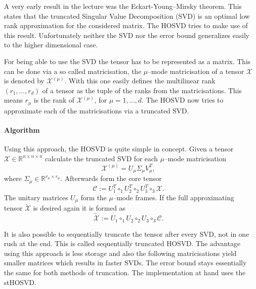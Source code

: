\documentclass[%
a4paper,
parskip=half,
DIV=calc,
]
{scrartcl}
\begin{document}
A very early result in the lecture was the Eckart-Young--Mirsky
theorem. This states that the truncated Singular Value Decomposition
(SVD) is an optimal low rank approximation for the considered matrix.
The HOSVD tries to make use of this result. Unfortunately neither the
SVD nor the error bound generalizes easily to the higher dimensional
case.

For being able to use the SVD the tensor has to be represented as a
matrix.  This can be done via a so called matricisation, the
$\mu$--mode matricisation of a tensor $\mathcal{X}$ is denoted by
$\mathcal{X}^{(\mu)}$.  With this one easily defines the multilinear
rank $(r_1, \ldots, r_d)$ of a tensor as the tuple of the ranks from
the matricisations.  This means $r_{\mu}$ is the rank of
$\mathcal{X}^{(\mu)}$, for $\mu = 1, \ldots, d$. The HOSVD now tries
to approximate each of the matricisations via a truncated
SVD.

\paragraph{Algorithm}

Using this approach, the HOSVD is quite simple in concept. Given a
tensor $\mathcal{X} \in \mathbb{R}^{n \times n \times n}$ calculate
the truncated SVD for each $\mu$--mode matricisation
\begin{equation*}
  \mathcal{X}^{(\mu)} = U_{\mu}\Sigma_{\mu}V_{\mu}^T ,
\end{equation*}
where $\Sigma_{\mu} \in \mathbb{R}^{r_\mu \times r_\mu}$. Afterwards form the core tensor
\begin{equation*}
  \mathcal{C} := U_1^T \circ_1 U_2^T \circ_2 U_3^T \circ_3 \mathcal{X}.
\end{equation*}
The unitary matrices $U_{\mu}$ form the $\mu$--mode frames. If the
full approximating tensor $\tilde{\mathcal{X}}$ is desired again it is formed as
\begin{equation*}
  \tilde{\mathcal{X}} := U_1 \circ_1 U_2 \circ_2 U_3 \circ_3 \mathcal{C}.
\end{equation*}

It is also possible to sequentially truncate the tensor after every
SVD, not in one rush at the end.  This is called sequentially
truncated HOSVD.  The advantage using this approach is less storage
and also the following matricisations yield smaller matrices which
results in faster SVDs.  The error bound stays essentially the same
for both methods of truncation.  The implementation at hand uses the
stHOSVD.
\end{document}
